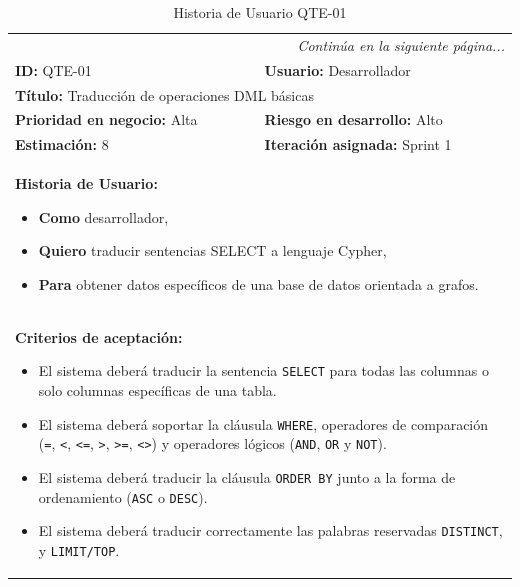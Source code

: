 \begin{longtable}[c]{|m{}|m{}|}
    \caption{Historia de Usuario QTE-01}
    \label{tab:qte01} \\
    
    \hline
    \endfirsthead
    \endhead
    \multicolumn{2}{r}{\textit{Continúa en la siguiente página...}} \\
    \endfoot
    \endlastfoot

    \textbf{ID:} QTE-01 & \textbf{Usuario:} Desarrollador \\
    \hline
    \multicolumn{2}{|l|}{\textbf{Título:} Traducción de operaciones DML básicas} \\
    \hline
    \textbf{Prioridad en negocio:} Alta & \textbf{Riesgo en desarrollo:} Alto \\
    \hline
    \textbf{Estimación:} 8 & \textbf{Iteración asignada:} Sprint 1 \\
    \hline
    \multicolumn{2}{|p{0.92\textwidth}|}{
        \textbf{Historia de Usuario:}
        \begin{itemize}[nosep, leftmargin=0.35cm, label={}, after=\vspace{0.5em}]
            \item \textbf{Como} desarrollador,
            \item \textbf{Quiero} traducir sentencias SELECT a lenguaje Cypher,
            \item \textbf{Para} obtener datos específicos de una base de datos orientada a grafos.
        \end{itemize}} \\
    \hline
    \multicolumn{2}{|p{0.92\textwidth}|}{
        \textbf{Criterios de aceptación:} 
        \begin{itemize}[nosep, leftmargin=0.75cm, after=\vspace{0.5em}]
            \item El sistema deberá traducir  la sentencia \texttt{SELECT} para todas las columnas o solo columnas específicas de una tabla.
            \item El sistema deberá soportar la cláusula \texttt{WHERE}, operadores de comparación (\texttt{=}, \texttt{<}, \texttt{<=}, \texttt{>}, \texttt{>=}, \texttt{<>}) y operadores lógicos (\texttt{AND}, \texttt{OR} y \texttt{NOT}).
            \item El sistema deberá traducir la cláusula \texttt{ORDER BY} junto a la forma de ordenamiento (\texttt{ASC} o \texttt{DESC}).
            \item El sistema deberá traducir correctamente las palabras reservadas \texttt{DISTINCT}, y \texttt{LIMIT/TOP}.

\end{itemize}}
\end{longtable}
